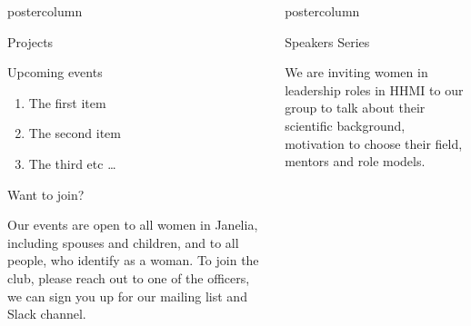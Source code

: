 \documentclass{beamer}
\newlength{\columnheight}
\begin{document}
\begin{frame}
\begin{columns}
\begin{column}{.33\textwidth}
\begin{beamercolorbox}[center,wd=\textwidth]{postercolumn}
\begin{minipage}[T]{.95\textwidth}
{\begin{myblock}{Projects}
                    \end{myblock}
                    \begin{myblock}{Upcoming events}
                        \begin{addmargin}[1em]{1em}
                            \begin{enumerate}
                                \item The first item
                                \item The second item
                                \item The third etc \ldots
                            \end{enumerate}
                        \end{addmargin}
                    \end{myblock}
                    \vspace{1.25cm}
                    \begin{myblock}{Want to join?}
                        \begin{addmargin}[1em]{1em}
                            Our events are open to all women in Janelia, including spouses and children, and to all people, who identify as a woman.\newline
                            To join the club, please reach out to one of the officers, we can sign you up for our mailing list and Slack channel.
                        \end{addmargin}
                    \end{myblock}
                }
		    \end{minipage}\end{beamercolorbox}
  \end{column}
	\begin{column}{.33\textwidth}
		\begin{beamercolorbox}[center,wd=\textwidth]{postercolumn}
			\begin{minipage}[T]{.95\textwidth}
				\parbox[t][\columnheight]{\textwidth}{
					\begin{myblock}{Speakers Series}
            \begin{addmargin}[1em]{1em}
                We are inviting women in leadership roles in HHMI to our group to talk about their scientific background, motivation to choose their field, mentors and role models.
                \vspace{1cm}
            \end{addmargin}
            \begin{addmargin}[1em]{1em}

\end{addmargin}
\end{myblock}}
\end{minipage}
\end{beamercolorbox}
\end{column}
\end{columns}
\end{frame}
\end{document}
